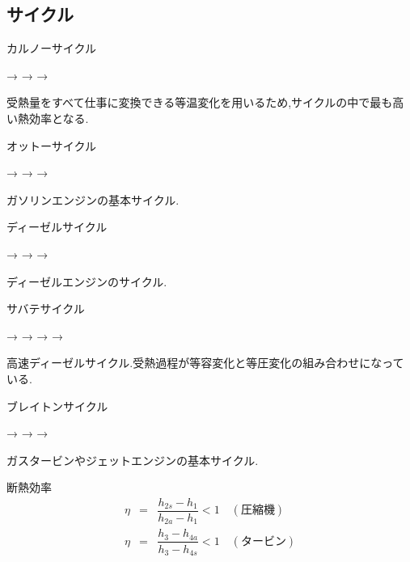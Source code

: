 \documentclass[a4paper]{jsarticle}
\begin{document}
\subsection{サイクル}
\begin{itembox}[l]{カルノーサイクル}
    \begin{center}
        \quad → \quad {} \quad → \quad {} \quad → \quad {}
    \end{center}
\end{itembox}
受熱量をすべて仕事に変換できる等温変化を用いるため,サイクルの中で最も高い熱効率となる.
\begin{itembox}[l]{オットーサイクル}
    \begin{center}
        \quad → \quad {} \quad → \quad {} \quad → \quad {}
    \end{center}
\end{itembox}
ガソリンエンジンの基本サイクル.
\begin{itembox}[l]{ディーゼルサイクル}
    \begin{center}
        \quad → \quad {} \quad → \quad {} \quad → \quad {}
    \end{center}
\end{itembox}
ディーゼルエンジンのサイクル.
\begin{itembox}[l]{サバテサイクル}
    \begin{center}
        \quad → \quad {}\quad → \quad {} \quad → \quad {} \quad → \quad {}
    \end{center}
\end{itembox}
高速ディーゼルサイクル.受熱過程が等容変化と等圧変化の組み合わせになっている.
\begin{itembox}[l]{ブレイトンサイクル}
    \begin{center}
        \quad → \quad {} \quad → \quad {} \quad → \quad {}
    \end{center}
\end{itembox}
ガスタービンやジェットエンジンの基本サイクル.
\begin{itembox}[l]{断熱効率}
    \begin{eqnarray*}
        \eta &=& \dfrac{h_{2s}-h_1}{h_{2a}-h_1} <1 \quad (圧縮機)\\
        \eta &=& \dfrac{h_3-h_{4a}}{h_3-h_{4s}} <1 \quad (タービン)\\
    \end{eqnarray*}
\end{itembox}
\end{document}
